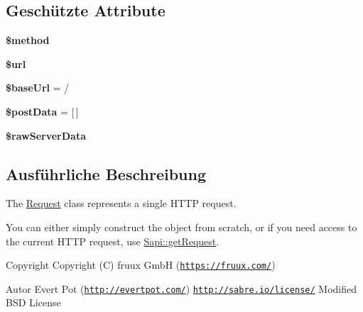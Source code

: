 \subsection*{Geschützte Attribute}
\begin{DoxyCompactItemize}
\item 
\mbox{\label{class_sabre_1_1_h_t_t_p_1_1_request_ad6b2d8a2cf99c27a258eb5d482d5fb93}} 
{\bfseries \$method}
\item 
\mbox{\label{class_sabre_1_1_h_t_t_p_1_1_request_a8a8b70f162103c29b981f7d0b07849f4}} 
{\bfseries \$url}
\item 
\mbox{\label{class_sabre_1_1_h_t_t_p_1_1_request_adcc469f27c3f89a5a445478f975042c6}} 
{\bfseries \$base\+Url} = \textquotesingle{}/\textquotesingle{}
\item 
\mbox{\label{class_sabre_1_1_h_t_t_p_1_1_request_ae00fcd5ab8a93e69dd27a3cacedb9b3c}} 
{\bfseries \$post\+Data} = \mbox{[}$\,$\mbox{]}
\item 
\mbox{\label{class_sabre_1_1_h_t_t_p_1_1_request_ae8e944b4c2d1ed23e77b89a73b0c01d9}} 
{\bfseries \$raw\+Server\+Data}
\end{DoxyCompactItemize}


\subsection{Ausführliche Beschreibung}
The \mbox{\hyperlink{class_sabre_1_1_h_t_t_p_1_1_request}{Request}} class represents a single H\+T\+TP request.

You can either simply construct the object from scratch, or if you need access to the current H\+T\+TP request, use \mbox{\hyperlink{class_sabre_1_1_h_t_t_p_1_1_sapi_a9a6f473099bc96ae72e657cb161ee6f1}{Sapi\+::get\+Request}}.

\begin{DoxyCopyright}{Copyright}
Copyright (C) fruux GmbH (\href{https://fruux.com/}{\tt https\+://fruux.\+com/}) 
\end{DoxyCopyright}
\begin{DoxyAuthor}{Autor}
Evert Pot (\href{http://evertpot.com/}{\tt http\+://evertpot.\+com/})  \href{http://sabre.io/license/}{\tt http\+://sabre.\+io/license/} Modified B\+SD License 
\end{DoxyAuthor}


